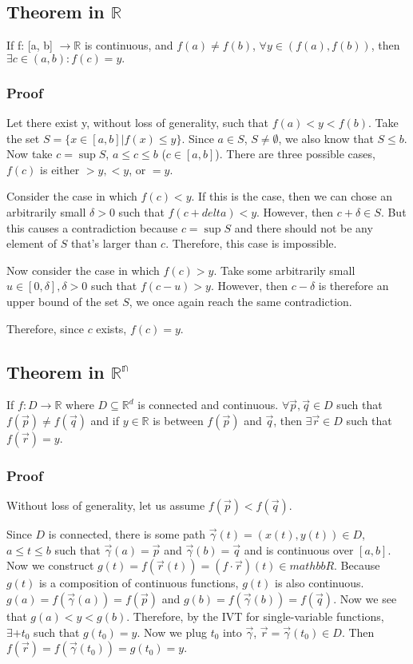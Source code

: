 \documentclass[11 pt, twoside]{article}
\begin{document}
\subsection{Theorem in $\mathbb{R}$}
If f: [a, b] $\to \mathbb{R}$ is continuous, and $f(a) \neq f(b)$, $\forall y \in (f(a), f(b))$, then $\exists c \in (a, b): f(c) = y.$

\subsubsection{Proof}
Let there exist y, without loss of generality, such that $f(a) < y < f(b)$. Take the set $S = \{x \in [a, b] | f(x) \leq
y\}$. Since $a \in S$, $S \neq \emptyset$, we also know that $S \leq b$. Now
take $c = \sup S$, $a \leq c \leq b$ ($c \in [a, b]$). There are three possible
cases, $f(c)$ is either $> y, < y$, or $= y$.

Consider the case in which $f(c) < y$. If this is the case, then we can chose an
arbitrarily small $\delta > 0$ such that $f(c + delta) < y$. However, then $c +
\delta \in S$. But this causes a contradiction because $c = \sup S$ and there
should not be any element of $S$ that's larger than $c$. Therefore, this case is
impossible.

Now consider the case in which $f(c) > y$. Take some arbitrarily small $u \in
[0, \delta], \delta > 0$ such that $f(c - u) > y$. However, then $c - \delta$ is
therefore an upper bound of the set $S$, we once again reach the same
contradiction.

Therefore, since $c$ exists, $f(c) = y$.

\subsection{Theorem in $\mathbb{R^n}$}

If $f : D \to \mathbb{R}$ where $D \subseteq \mathbb{R}^d$ is connected
and continuous. $\forall \vec{p}, \vec{q} \in D$ such that $f(\vec{p}) \neq
f(\vec{q})$ and if $y \in \mathbb{R}$ is between $f(\vec{p})$ and $\vec{q}$,
then $\exists \vec{r} \in D$ such that $f(\vec{r}) = y$.

\subsubsection{Proof}

Without loss of generality, let us assume $f(\vec{p}) < f(\vec{q})$.

Since $D$ is connected, there is some path $\vec{\gamma}(t) = (x(t), y(t)) \in
D$, $a \leq t \leq b$ such that $\vec{\gamma}(a) = \vec{p}$ and $\vec{\gamma}(b)
= \vec{q}$ and is continuous over $[a, b]$. Now we construct $g(t) =
f(\vec{r}(t)) = (f\cdot\vec{r})(t) \in mathbb{R}$. Because $g(t)$ is a
composition of continuous functions, $g(t)$ is also continuous. $g(a) =
f(\vec{\gamma}(a)) = f(\vec{p})$ and $g(b) = f(\vec{\gamma}(b)) = f(\vec{q})$.
Now we see that $g(a) < y < g(b)$. Therefore, by the IVT for single-variable
functions, $\exists+t_0$ such that $g(t_0) = y$. Now we plug $t_0$ into
$\vec{\gamma}$, $\vec{r} = \vec{\gamma}(t_0) \in D$. Then $f(\vec{r}) =
f(\vec{\gamma}(t_0)) = g(t_0) = y$.
\end{document}
